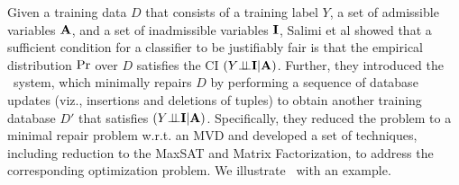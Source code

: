 \documentclass[11pt]{article}
\begin{document}
Given a training data $D$ that consists of a training label $Y$, a set of admissible variables ${\mathbf{A}}$, and a set of inadmissible variables ${\mathbf{I}}$, Salimi et al \cite{salimi2019interventional} showed that a sufficient condition for a classifier to be justifiably fair is that the empirical distribution ${\tt \mathrm{Pr}}$ over $D$ satisfies the CI $(Y \mbox{$\perp\!\!\!\perp$} {\mathbf{I}} |{\mathbf{A}})$.  Further, they introduced the \sys\ system, which minimally repairs $D$ by performing a sequence of database updates (viz., insertions and deletions of
tuples) to obtain another training database $D'$ that satisfies 
$(Y \mbox{$\perp\!\!\!\perp$} {\mathbf{I}} |{\mathbf{A}})$. Specifically, they reduced the problem to a minimal repair problem w.r.t. an MVD and developed a set of techniques, including reduction to the MaxSAT and Matrix Factorization, to address the corresponding optimization problem. We illustrate \sys\ with an example.
\end{document}

